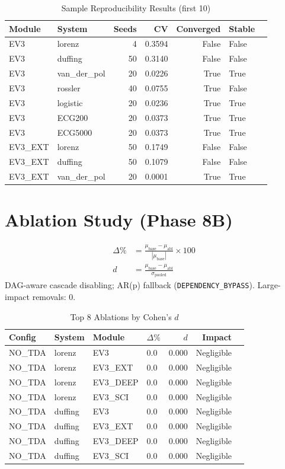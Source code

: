 \documentclass[12pt,a4paper]{article}
\begin{document}
\begin{table}[h]
\centering
\caption{Sample Reproducibility Results (first 10)}
\begin{tabular}{llrrrll}
\toprule
Module & System & Seeds & CV & Converged & Stable \\
\midrule
        EV3 & lorenz & 4 & 0.3594 & False & False \\
        EV3 & duffing & 50 & 0.3140 & False & False \\
        EV3 & van_der_pol & 20 & 0.0226 & True & True \\
        EV3 & rossler & 40 & 0.0755 & True & False \\
        EV3 & logistic & 20 & 0.0236 & True & True \\
        EV3 & ECG200 & 20 & 0.0373 & True & True \\
        EV3 & ECG5000 & 20 & 0.0373 & True & True \\
        EV3\_EXT & lorenz & 50 & 0.1749 & False & False \\
        EV3\_EXT & duffing & 50 & 0.1079 & False & False \\
        EV3\_EXT & van_der_pol & 20 & 0.0001 & True & True \\
\bottomrule
\end{tabular}
\end{table}

\section{Ablation Study (Phase 8B)}
\begin{align}
\Delta\% &= \frac{\mu_{\text{base}} - \mu_{\text{abl}}}{|\mu_{\text{base}}|} \times 100 \\
d &= \frac{\mu_{\text{base}} - \mu_{\text{abl}}}{\sigma_{\text{pooled}}}
\end{align}
DAG-aware cascade disabling; AR(p) fallback (\texttt{DEPENDENCY\_BYPASS}).
Large-impact removals: 0.

\begin{table}[h]
\centering
\caption{Top 8 Ablations by Cohen's $d$}
\begin{tabular}{llllrrl}
\toprule
Config & System & Module & $\Delta\%$ & $d$ & Impact \\
\midrule
        NO\_TDA & lorenz & EV3 & 0.0 & 0.000 & Negligible \\
        NO\_TDA & lorenz & EV3\_EXT & 0.0 & 0.000 & Negligible \\
        NO\_TDA & lorenz & EV3\_DEEP & 0.0 & 0.000 & Negligible \\
        NO\_TDA & lorenz & EV3\_SCI & 0.0 & 0.000 & Negligible \\
        NO\_TDA & duffing & EV3 & 0.0 & 0.000 & Negligible \\
        NO\_TDA & duffing & EV3\_EXT & 0.0 & 0.000 & Negligible \\
        NO\_TDA & duffing & EV3\_DEEP & 0.0 & 0.000 & Negligible \\
        NO\_TDA & duffing & EV3\_SCI & 0.0 & 0.000 & Negligible \\
\bottomrule
\end{tabular}
\end{table}
\end{document}
